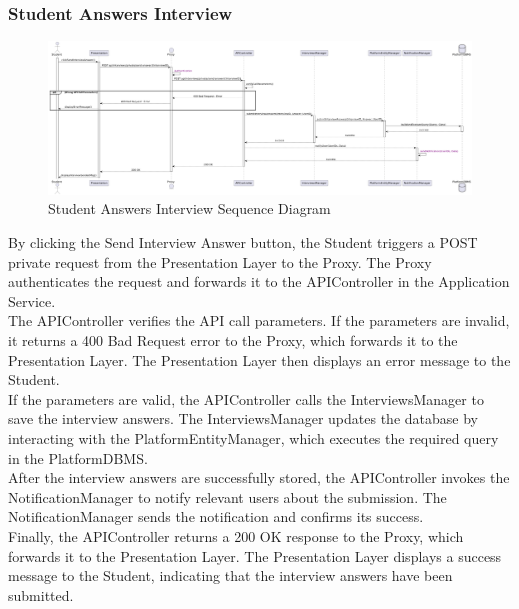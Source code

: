 \subsubsection*{Student Answers Interview}
\begin{figure}[H]
    \centering
    \includegraphics[width=\linewidth]{Latex/Images/DD/SequenceDiagrams/9StudentSubmitInterview.png}
    \caption{Student Answers Interview Sequence Diagram}
    \label{fig:studsubint}
\end{figure}
By clicking the Send Interview Answer button, the Student triggers a POST private request from the Presentation Layer to the Proxy. The Proxy authenticates the request and forwards it to the APIController in the Application Service.\\
The APIController verifies the API call parameters. If the parameters are invalid, it returns a 400 Bad Request error to the Proxy, which forwards it to the Presentation Layer. The Presentation Layer then displays an error message to the Student.\\
If the parameters are valid, the APIController calls the InterviewsManager to save the interview answers. The InterviewsManager updates the database by interacting with the PlatformEntityManager, which executes the required query in the PlatformDBMS.\\
After the interview answers are successfully stored, the APIController invokes the NotificationManager to notify relevant users about the submission. The NotificationManager sends the notification and confirms its success.\\
Finally, the APIController returns a 200 OK response to the Proxy, which forwards it to the Presentation Layer. The Presentation Layer displays a success message to the Student, indicating that the interview answers have been submitted.

